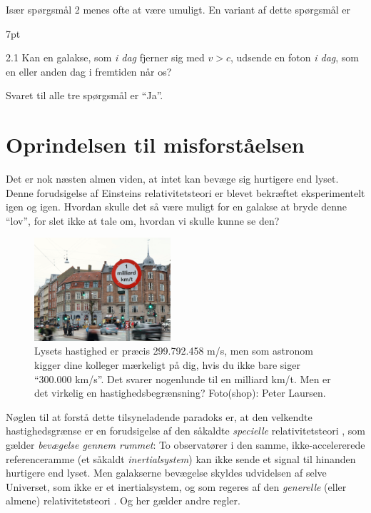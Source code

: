 \documentclass[useAMS,danish]{aa}
\def\vrec{\mbox{$v$}}
\newenvironment{formal}{%
  \def\FrameCommand{%
    \hspace{1pt}%
    {\color{blue}\vrule width 2pt}%
    {\color{formalshade}\vrule width 4pt}%
    \colorbox{formalshade}%
  }%
  \MakeFramed{\advance\hsize-\width\FrameRestore}%
  \noindent\hspace{-4.55pt}%
  \begin{adjustwidth}{}{7pt}%
  \vspace{2pt}\vspace{2pt}%
}
{%
  \vspace{2pt}\end{adjustwidth}\endMakeFramed%
}
\begin{document}
Især spørgsmål 2 menes ofte at være umuligt.
En variant af dette spørgsmål er
\begin{formal}
    2.1 Kan en galakse, som \emph{i dag} fjerner sig med $\vrec>c$, udsende en foton \emph{i dag}, som en eller anden dag i fremtiden når os?
\end{formal}

Svaret til alle tre spørgsmål er ``Ja''.

\section{Oprindelsen til misforståelsen}
\label{sec:oprindelsen}

Det er nok næsten almen viden, at intet kan bevæge sig hurtigere end lyset.
Denne forudsigelse af Einsteins relativitetsteori er blevet bekræftet eksperimentelt igen og igen.
Hvordan skulle det så være muligt for en galakse at bryde denne ``lov'', for slet ikke at tale om, hvordan vi skulle kunne se den?
\begin{figure}[!b]
    \centering
    \includegraphics [width=0.45\textwidth] {./lysets-fart-skilt.pdf}
    \caption{\small{Lysets hastighed er præcis 299.792.458 m/s, men som astronom kigger dine kolleger mærkeligt på dig, hvis du ikke bare siger ``300.000 km/s''. Det svarer nogenlunde til en milliard km/t. Men er det virkelig en hastighedsbegrænsning? Foto(shop): Peter Laursen.}
    }
    \label{fig:c-skilt}
\end{figure}

Nøglen til at forstå dette tilsyneladende paradoks er, at den velkendte hastighedsgrænse er en forudsigelse af den såkaldte \emph{specielle} relativitetsteori \citep{Einstein1905}, som gælder \emph{bevægelse gennem rummet}:
To observatører i den samme, ikke-accelererede referenceramme (et såkaldt   \emph{inertialsystem}) kan ikke sende et signal til hinanden hurtigere end lyset.
Men galakserne bevægelse skyldes udvidelsen af selve Universet, som ikke er et inertialsystem, og som regeres af den \emph{generelle} (eller almene) relativitetsteori \citep{Einstein1916}.
Og her gælder andre regler.
\end{document}
